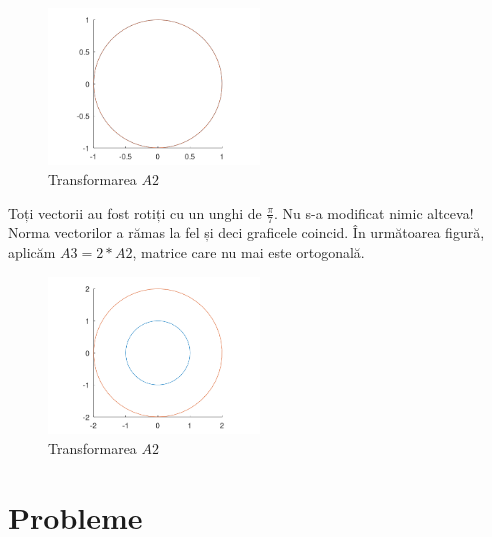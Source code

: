 \documentclass{exam}
\begin{document}
\begin{figure}[ht]
	\centering
	\includegraphics[width=0.5\textwidth]{plot3}
	\caption{Transformarea $A2$}
	\label{fig:3}
\end{figure}

\par Toți vectorii au fost rotiți cu un unghi de $\frac{\pi}{7}$. Nu s-a
modificat nimic altceva! Norma vectorilor a rămas la fel și deci graficele
coincid. În următoarea figură, aplicăm $A3 = 2 * A2$, matrice care nu mai este
ortogonală.

\begin{figure}[ht]
	\centering
	\includegraphics[width=0.5\textwidth]{plot4}
	\caption{Transformarea $A2$}
	\label{fig:4}
\end{figure}

\section{Probleme}
\end{document}
